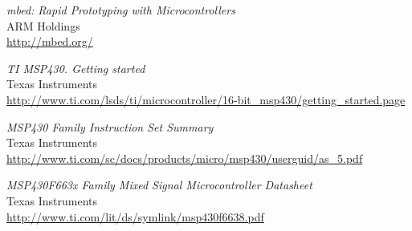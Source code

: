 \begin{thebibliography}{widest-label}
	\emph{mbed: Rapid Prototyping with Microcontrollers}\\
	ARM Holdings\\
	\url{http://mbed.org/}
	
	\emph{TI MSP430. Getting started}\\
	Texas Instruments\\
	\url{http://www.ti.com/lsds/ti/microcontroller/16-bit_msp430/getting_started.page}
	
	\emph{MSP430 Family Instruction Set Summary}\\
	Texas Instruments\\
	\url{http://www.ti.com/sc/docs/products/micro/msp430/userguid/as_5.pdf}
	
	\emph{MSP430F663x Family Mixed Signal Microcontroller Datasheet}\\
	Texas Instruments\\
	\url{http://www.ti.com/lit/ds/symlink/msp430f6638.pdf}




\end{thebibliography}
